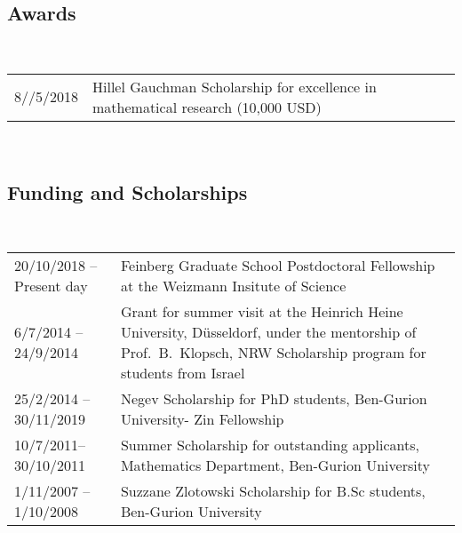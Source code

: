 \documentclass[leqno,11pt,a4paper]{amsart}
\numberwithin{equation}{section}
\numberwithin{figure}{section}
\theoremstyle{plain}
\theoremstyle{definition}
\theoremstyle{remark}
\begin{document}
\subsection*{\sc Awards}
~
\begin{longtable}{p{}p{}}
8//5/2018 & Hillel Gauchman Scholarship for excellence in mathematical research (10,000 USD)
\end{longtable}
~\\
\subsection*{\sc Funding and Scholarships}~
\begin{longtable}{p{}p{}}
20/10/2018 -- Present day & Feinberg Graduate School Postdoctoral Fellowship at the Weizmann Insitute of Science\\
6/7/2014 -- 24/9/2014& Grant for summer visit at the Heinrich Heine University, D\"usseldorf, under the mentorship of Prof.~B.~Klopsch, NRW Scholarship program for students from Israel  \\
25/2/2014 -- 30/11/2019 & Negev Scholarship for PhD students, Ben-Gurion University- Zin Fellowship\\
10/7/2011-- 30/10/2011 & Summer Scholarship for outstanding applicants, Mathematics Department, Ben-Gurion University\\
1/11/2007 -- 1/10/2008 & Suzzane Zlotowski Scholarship for B.Sc students, Ben-Gurion University\\
\end{longtable}
\end{document}
